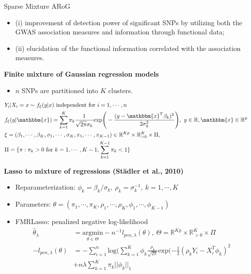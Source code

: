 \documentclass[final]{beamer}
\newcommand{\bi}{\begin{itemize}}
\newcommand{\ei}{\end{itemize}}
\newcommand{\dis}{\displaystyle}
\newcommand{\bx}{\mathbbm{x}}
\newcommand{\R}{\mathbb{R}}
\begin{document}
\begin{frame}{}
\begin{columns}[t]
\begin{column}{1\linewidth}
\begin{columns}
\begin{column}{.26\textwidth}
\begin{block}{Sparse Mixture ARoG}
\begin{center}
\bi
\item[(i)] improvement of detection power of significant SNPs by utilizing both the GWAS association measures and information through functional data;
\item[(ii)] elucidation of the functional information correlated with the association measures.
\ei
\end{center}

{\color{orange!100} \textbf{Finite mixture of Gaussian regression models}}
\centering
\bi
\item $n$ SNPs are partitioned into $K$ clusters.
\ei
{\small
\begin{align*}
&Y_i|X_i=x \sim f_{\xi}(y|x) \text{ independent for } i=1,\cdots, n\\
&f_{\xi}(y|\bx)=\dis\sum_{k=1}^K\pi_k\dis\frac{1}{\sqrt{2\pi}\sigma_k}\mathrm{exp}\Bigg(-\dis\frac{(y-\bx^T\beta_k)^2}{2\sigma^2_k}\Bigg),   ~y \in \R, \bx\in \R^p\\%
&\xi=(\beta_1,\cdots, \beta_K, \sigma_1,\cdots, \sigma_K, \pi_1,\cdots,\pi_{K-1})\in \R^{Kp}\times \R^K_{>0}\times \Pi,\\
&\Pi=\{\pi: \pi_k>0 \text{ for } k=1,\cdots, K-1, \dis\sum_{k=1}^{K-1}\pi_k<1\}
\end{align*}
}

{\color{orange!100} \textbf{Lasso to mixture of regressions (St\"{a}dler et al., 2010)}}
\bi
\item Reparameterization: {\small
$\phi_k=\beta_k/\sigma_k,~\rho_k=\sigma^{-1}_k,~k=1, \cdots, K$
}
\item Parameters: {\small
$\theta=(\pi_1, \cdots, \pi_K, \rho_1, \cdots, \rho_K, \phi_1, \cdots, \phi_{K-1})$
}
\item FMRLasso: penalized negative log-likelihood
{\small
\begin{align*}
\hat{\theta}_{\lambda}&=\underset{\theta \in \Theta}{\mathrm{argmin}}-n^{-1}l_{pen,\lambda}(\theta),~\Theta=\R^{Kp}\times \R^K_{>0}\times \Pi\\
-l_{pen,\lambda}(\theta)&=-\dis\sum_{i=1}^n\mathrm{log}(\dis\sum_{k=1}^K\phi_k\dis\frac{\rho_k}{\sqrt{2\pi}}\mathrm{exp}(-\dis\frac{1}{2}(\rho_kY_i-X_i^T\phi_k)^2\\
&+n\lambda\dis\sum_{k=1}^{K}\pi_k||\phi_k||_1\\
\end{align*}
}
\ei


\end{block}
\end{column}
\end{columns}
\end{column}
\end{columns}
\end{frame}
\end{document}
